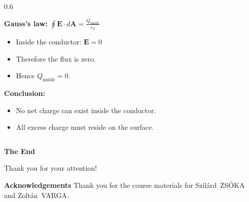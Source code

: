 \documentclass[t,aspectratio=169]{beamer}
\begin{document}
\begin{frame}
\begin{itemize}
\begin{columns}
\begin{column}{0.6\textwidth}

\textbf{Gauss's law:}
$\oint \mathbf{E} \cdot d\mathbf{A} = \frac{Q_{\text{inside}}}{\varepsilon_0}$

\begin{itemize}
\item Inside the conductor: $\mathbf{E}=0$
\item Therefore the flux is zero.
\item Hence $Q_{\text{inside}}=0$.
\end{itemize}

\textbf{Conclusion:}
\begin{itemize}
\item No net charge can exist inside the conductor.
\item All excess charge must reside on the surface.
\end{itemize}
\end{column}
\end{columns}

\end{itemize}
\end{frame}



\begin{frame}

\vfill
\begin{center}
\textbf{\huge The End}

\bigskip
Thank you for your attention!
\end{center}
\vfill
\textbf{Acknowledgements} Thank you for the course materials for Szilárd~ZSÓKA and Zoltán~VARGA.
\end{frame}
\end{document}
